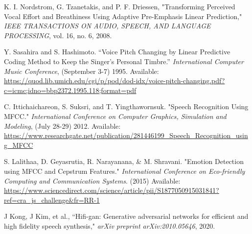 \documentclass{article}
\begin{document}
\begin{thebibliography}{citations}
\bibitem{}
K. I. Nordstrom, G. Tzanetakis, and P. F. Driessen, "Transforming Perceived Vocal Effort and Breathiness
Using Adaptive Pre-Emphasis Linear Prediction," \textit{IEEE TRANSACTIONS ON AUDIO, SPEECH, AND LANGUAGE PROCESSING}, vol. 16, no. 6, 2008.

Y. Sasahira and S. Hashimoto. “Voice Pitch Changing by Linear Predictive Coding Method to Keep the Singer’s Personal Timbre.” \textit{International Computer Music Conference}, (September 3-7) 1995. Available: \url{https://quod.lib.umich.edu/cgi/p/pod/dod-idx/voice-pitch-changing.pdf?c=icmc;idno=bbp2372.1995.118;format=pdf}

C. Ittichaichareon, S. Suksri, and T. Yingthawornsuk. "Speech Recognition Using MFCC." \textit{International Conference on Computer Graphics, Simulation and Modeling}, (July 28-29) 2012. Available: \url{https://www.researchgate.net/publication/281446199_Speech_Recognition_using_MFCC}

S. Lalithaa, D. Geyasrutia, R. Narayanana, \& M. Shravani. "Emotion Detection using MFCC and Cepstrum Features." \textit{International Conference on Eco-friendly Computing and Communication Systems}. (2015) Available: \url{https://www.sciencedirect.com/science/article/pii/S1877050915031841?ref=cra_js_challenge&fr=RR-1}

J Kong, J Kim, et al., “Hifi-gan: Generative adversarial networks for efficient and high fidelity speech synthesis," \textit{arXiv preprint arXiv:2010.05646}, 2020.

\end{thebibliography}
%
%
%
%
\end{document}
